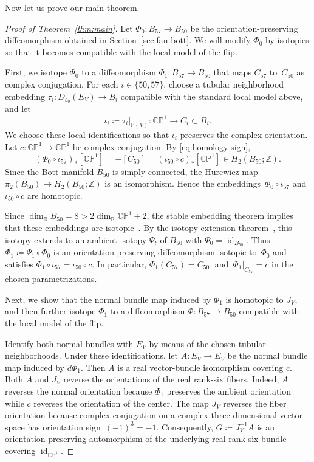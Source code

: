 \documentclass[10pt,a4paper]{amsart}
\numberwithin{equation}{section}
\newcommand{\Z}{\mathbb Z}
\newcommand{\R}{\mathbb R}
\renewcommand{\P}{\mathbb P}
\newcommand{\CP}{\mathbb{CP}}
\DeclareMathOperator{\id}{id}
\begin{document}
Now let us prove our main theorem.
\begin{proof}[Proof of Theorem~\ref{thm:main}]
    Let $\Phi_0\colon B_{57}\to B_{50}$ be the orientation-preserving diffeomorphism obtained in Section~\ref{sec:fan-bott}.
    We will modify $\Phi_0$ by isotopies so that it becomes compatible with the local model of the flip. 

    First, we isotope $\Phi_0$ to a diffeomorphism $\Phi_1\colon B_{57}\to B_{50}$ that maps $C_{57}$ to~$C_{50}$ as complex conjugation. 
    For each $i\in\{50,57\}$, choose a tubular neighborhood embedding $\tau_i\colon D_{\varepsilon_0}(E_V)\to B_i$ compatible with the standard local model above, and let
    $$
        \iota_i\coloneq \left.\tau_i\right|_{\P(V)} \colon \CP^1\longrightarrow C_i\subset B_i.
    $$
    We choose these local identifications so that $\iota_i$ preserves the complex orientation. 
    Let $c\colon\CP^1\to\CP^1$ be complex conjugation.
    By \eqref{eq:homology-sign},
    $$
        (\Phi_0\circ\iota_{57})_*[\CP^1] = -[C_{50}]= (\iota_{50}\circ c)_*[\CP^1] \in H_2(B_{50};\Z).
    $$
    Since the Bott manifold $B_{50}$ is simply connected, the Hurewicz map $\pi_2(B_{50})\to H_2(B_{50};\Z)$ is an isomorphism. 
    Hence the embeddings~$\Phi_0\circ\iota_{57}$ and $\iota_{50}\circ c$ are homotopic.
    
    Since $\dim_\R B_{50}=8>2\dim_\R \CP^1+2$, the stable embedding theorem implies that these embeddings are isotopic~\cite[Proposition~II]{Mazur1963}. 
    By the isotopy extension theorem~\cite[Proposition~III]{Mazur1963}, this isotopy extends to an ambient isotopy $\Psi_t$ of $B_{50}$ with $\Psi_0 = \id_{B_{50}}$.
    Thus $\Phi_1 \coloneq \Psi_1 \circ \Phi_0$ is an orientation-preserving diffeomorphism isotopic to~$\Phi_0$ and satisfies $\Phi_1\circ\iota_{57}=\iota_{50}\circ c$.
    In particular, $\Phi_1(C_{57})=C_{50}$, and~$\Phi_1|_{C_{57}}=c$ in the chosen parametrizations. 
    
    Next, we show that the normal bundle map induced by $\Phi_1$ is homotopic to $J_V$, and then further isotope $\Phi_1$ to a diffeomorphism $\Phi\colon B_{57}\to B_{50}$ compatible with the local model of the flip.
    
    Identify both normal bundles with $E_V$ by means of the chosen tubular neighborhoods. 
    Under these identifications, let $A\colon E_V\to E_V$ be the normal bundle map induced by $d\Phi_1$. 
    Then $A$ is a real vector-bundle isomorphism covering $c$.
    Both $A$ and $J_V$ reverse the orientations of the real rank-six fibers. 
    Indeed, $A$ reverses the normal orientation because $\Phi_1$ preserves the ambient orientation while $c$ reverses the orientation of the center. 
    The map $J_V$ reverses the fiber orientation because complex conjugation on a complex three-dimensional vector space has orientation sign~$(-1)^3=-1$. 
    Consequently, $G\coloneq J_V^{-1}A$ is an orientation-preserving automorphism of the underlying real rank-six bundle covering $\id_{\CP^1}$.
    

\end{proof}
\end{document}
